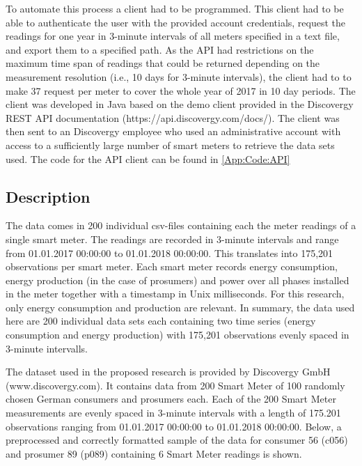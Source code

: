 To automate this process a client had to be programmed. This client  had to be able to authenticate the user with the provided account credentials, request the readings for one year in 3-minute intervals of all meters specified in a text file, and export them to a specified path. As the API had restrictions on the maximum time span of readings that could be returned depending on the measurement resolution (i.e., 10 days for 3-minute intervals), the client had to to make 37 request per meter to cover the whole year of 2017 in 10 day periods. The client was developed in Java based on the demo client provided in the Discovergy REST API documentation (https://api.discovergy.com/docs/). The client was then sent to an Discovergy employee who used an administrative account with access to a sufficiently large number of smart meters to retrieve the data sets used. The code for the API client can be found in \ref{App:Code:API}


\subsection{Description}\label{Sec:Data;Subsec:Description}

The data comes in 200 individual csv-files containing each the meter readings of a single smart meter. The readings are recorded in 3-minute intervals and range from 01.01.2017 00:00:00 to 01.01.2018 00:00:00. This translates into 175,201 observations per smart meter. Each smart meter records  energy consumption,  energy production (in the case of prosumers) and power over all phases installed in the meter together with a timestamp in Unix milliseconds. For this research, only energy consumption and production are relevant. In summary, the data used here are 200 individual data sets each containing two time series (energy consumption and energy production) with 175,201 observations evenly spaced in 3-minute intervalls.

The dataset used in the proposed research is provided by Discovergy GmbH (www.discovergy.com). It contains data from 200 Smart Meter of 100 randomly chosen German consumers and prosumers each. Each of the 200 Smart Meter measurements are evenly spaced in 3-minute intervals with a length of 175.201 observations ranging from 01.01.2017 00:00:00 to 01.01.2018 00:00:00.
Below, a preprocessed and correctly formatted sample of the data for consumer 56 (c056) and prosumer 89 (p089) containing 6 Smart Meter readings is shown.

